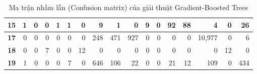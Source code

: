 \begin{table}[H]
\begin{tabular}{rrrrrrrrrrrrrrrrr}
\multicolumn{1}{|r|}{\textbf{15}}    & \multicolumn{1}{r|}{1}          & \multicolumn{1}{r|}{0}          & \multicolumn{1}{r|}{0}          & \multicolumn{1}{r|}{1}          & \multicolumn{1}{r|}{1}          & \multicolumn{1}{r|}{0}          & \multicolumn{1}{r|}{9}          & \multicolumn{1}{r|}{1}          & \multicolumn{1}{r|}{0}          & \multicolumn{1}{r|}{9}          & \multicolumn{1}{r|}{0}           & \multicolumn{1}{r|}{92}          & \multicolumn{1}{r|}{88}          & \multicolumn{1}{r|}{4}           & \multicolumn{1}{r|}{0}           & \multicolumn{1}{r|}{26}          \\ \hline
\multicolumn{1}{|r|}{\textbf{17}}    & \multicolumn{1}{r|}{0}          & \multicolumn{1}{r|}{0}          & \multicolumn{1}{r|}{0}          & \multicolumn{1}{r|}{0}          & \multicolumn{1}{r|}{0}          & \multicolumn{1}{r|}{0}          & \multicolumn{1}{r|}{248}        & \multicolumn{1}{r|}{471}        & \multicolumn{1}{r|}{927}        & \multicolumn{1}{r|}{0}          & \multicolumn{1}{r|}{0}           & \multicolumn{1}{r|}{0}           & \multicolumn{1}{r|}{0}           & \multicolumn{1}{r|}{10,977}       & \multicolumn{1}{r|}{0}           & \multicolumn{1}{r|}{6}           \\ \hline
\multicolumn{1}{|r|}{\textbf{18}}    & \multicolumn{1}{r|}{0}          & \multicolumn{1}{r|}{0}          & \multicolumn{1}{r|}{7}          & \multicolumn{1}{r|}{0}          & \multicolumn{1}{r|}{0}          & \multicolumn{1}{r|}{12}         & \multicolumn{1}{r|}{0}          & \multicolumn{1}{r|}{0}          & \multicolumn{1}{r|}{0}          & \multicolumn{1}{r|}{0}          & \multicolumn{1}{r|}{0}           & \multicolumn{1}{r|}{0}           & \multicolumn{1}{r|}{0}           & \multicolumn{1}{r|}{0}           & \multicolumn{1}{r|}{12}          & \multicolumn{1}{r|}{0}           \\ \hline
\multicolumn{1}{|r|}{\textbf{19}}    & \multicolumn{1}{r|}{1}          & \multicolumn{1}{r|}{0}          & \multicolumn{1}{r|}{0}          & \multicolumn{1}{r|}{0}          & \multicolumn{1}{r|}{7}          & \multicolumn{1}{r|}{0}          & \multicolumn{1}{r|}{646}        & \multicolumn{1}{r|}{106}        & \multicolumn{1}{r|}{22}         & \multicolumn{1}{r|}{0}          & \multicolumn{1}{r|}{0}           & \multicolumn{1}{r|}{21}          & \multicolumn{1}{r|}{12}          & \multicolumn{1}{r|}{109}         & \multicolumn{1}{r|}{0}           & \multicolumn{1}{r|}{434}         \\ \hline
\end{tabular}
\caption{Ma trận nhầm lẫn (Confusion matrix) của giải thuật Gradient-Boosted Trees}
\end{table}